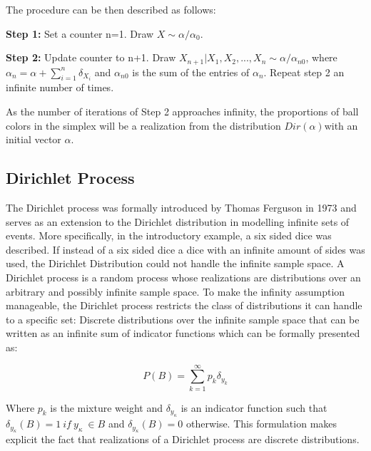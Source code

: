\documentclass[twoside,hidelinks]{article}
\begin{document}
The procedure can be then described as follows:
\begin{compactitem}

	\item \textbf{Step 1:} Set a counter n=1. Draw $ X \sim \alpha / \alpha_0 $. 
	\item \textbf{Step 2:} Update counter to n+1. Draw $ X_{n+1} | X_1, X_2, ..., X_n \sim \alpha / \alpha_{n0}$, where $\alpha_n = \alpha + \sum_{i=1}^n \delta_{X_i} $ and $ \alpha_{n0}$ is the sum of the entries of $\alpha_n$. Repeat step 2 an infinite number of times.
\end{compactitem}

As the number of iterations of Step 2 approaches infinity, the proportions of ball colors in the simplex will be a realization from the distribution $Dir(\alpha)$with an initial vector $\alpha$.



\subsection{Dirichlet Process}

The Dirichlet process was formally introduced by Thomas Ferguson in 1973 and serves as an extension to the Dirichlet distribution in modelling infinite sets of events. More specifically, in the introductory example, a six sided dice was described. If instead of a six sided dice a dice with an infinite amount of sides was used, the Dirichlet Distribution could not handle the infinite sample space. A Dirichlet process is a random process whose realizations are distributions over an arbitrary and possibly infinite sample space. To make the infinity assumption manageable, the Dirichlet process restricts the class of distributions it can handle to a specific set: Discrete distributions over the infinite sample space that can be written as an infinite sum of indicator functions which can be formally presented as:

$$ P( B ) = \sum_{k=1}^\infty p_k \delta_{y_k}  $$

Where $p_k$ is the mixture weight and $\delta_{y_\kappa}$ is an indicator function such that $\delta_{y_\kappa} (B)=1\ if\ y_{\kappa}\ \in B$ and  $\delta_{y_\kappa}(B)=0$ otherwise. This formulation makes explicit the fact that realizations of a Dirichlet process are discrete distributions.
\end{document}
